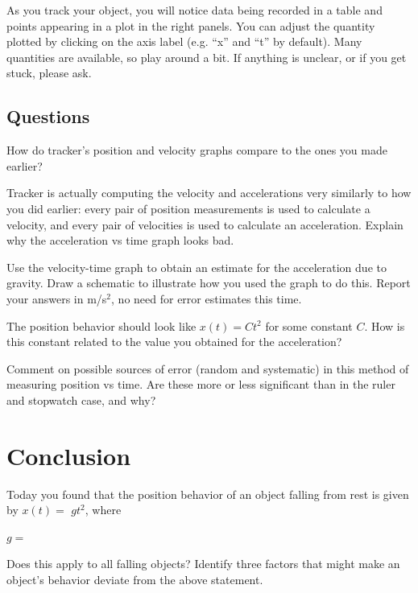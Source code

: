 \documentclass{handout}
\begin{document}
As you track your object, you will notice data being recorded in a table and
points appearing in a plot in the right panels. You can adjust the quantity
plotted by clicking on the axis label (e.g. “x” and “t” by default). Many
quantities are available, so play around a bit. If anything is unclear, or if you
get stuck, please ask.
\subsection{Questions}
\begin{questions}
    \question How do tracker's position and velocity graphs compare to the ones you made earlier?
    \clearpage

    \question Tracker is actually computing the velocity and accelerations very similarly to how you did earlier: every pair of position measurements is used to calculate a velocity, and every pair of velocities is used to calculate an acceleration. Explain why the acceleration vs time graph looks bad.

    \answerspace{\fill}

    \question Use the velocity-time graph to obtain an estimate for the acceleration due to gravity. Draw a schematic to illustrate how you used the graph to do this. Report your answers in m/s$^2$, no need for error estimates this time.

    \answerspace{\fill}

    \question The position behavior should look like $x(t)=Ct^2$ for some constant $C$. How is this constant related to the value you obtained for the acceleration?

    \answerspace{\fill}
    \answerspace{.5in}
    \clearpage

    \question Comment on possible sources of error (random and systematic) in this method of measuring position vs time. Are these more or less significant than in the ruler and stopwatch case, and why?

    \answerspace{2in}
\end{questions}

\section{Conclusion}
\begin{questions}
    \question Today you found that the position behavior of an object falling from rest is given by $x(t)=$ \blank[.5in] $gt^2$, where

    \answerspace{\baselineskip}

    $g=$ \blank[1in]

    \question Does this apply to all falling objects? Identify three factors that might make an object's behavior deviate from the above statement.
\end{questions}
\end{document}
